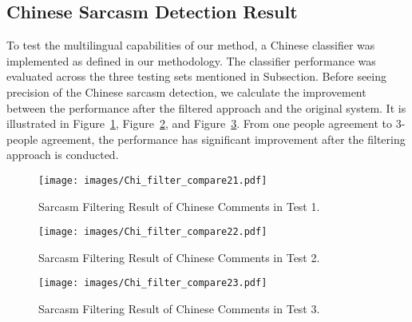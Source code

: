 \documentclass[12pt,a4paper]{report}
\theoremstyle{definition}
\begin{document}
\begin{CJK}{UTF8}{bsmi}
        \subsection{Chinese Sarcasm Detection Result}
        To test the multilingual capabilities of our method, a Chinese classifier was implemented as defined in our methodology. The classifier performance was evaluated across the three testing sets mentioned in Subsection.
        Before seeing precision of the Chinese sarcasm detection, we calculate the improvement between the performance after the filtered approach and the original system. 
        It is illustrated in Figure~\ref{fig:filter_agree1}, Figure~\ref{fig:filter_agree2}, and Figure~\ref{fig:filter_agree3}. From one people agreement to 3-people agreement, the performance has significant improvement after the filtering approach is conducted.
        
        \begin{center}
        \begin{figure}[H]
            \texttt{[image: images/Chi\_filter\_compare21.pdf]}
            \caption{Sarcasm Filtering Result of Chinese Comments in Test 1.}
            \label{fig:filter_agree1}
        \end{figure}
        \end{center}
        \begin{center}
        \begin{figure}[H]
            \texttt{[image: images/Chi\_filter\_compare22.pdf]}
            \caption{Sarcasm Filtering Result of Chinese Comments in Test 2.}
            \label{fig:filter_agree2}
        \end{figure}
        \end{center}
        \begin{center}
        \begin{figure}[H]
            \texttt{[image: images/Chi\_filter\_compare23.pdf]}
            \caption{Sarcasm Filtering Result of Chinese Comments in Test 3.}
            \label{fig:filter_agree3}
        \end{figure}
        \end{center}

\end{CJK}
\end{document}
